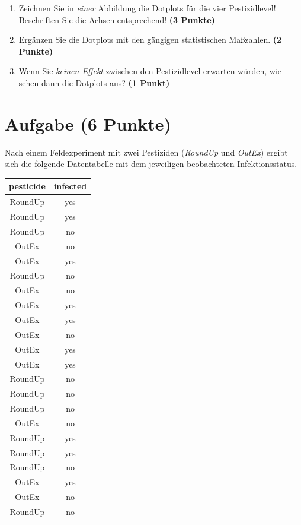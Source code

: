 \documentclass[a4paper, 10pt]{scrartcl}\usepackage[]{graphicx}\usepackage[]{xcolor}
\begin{document}
\begin{enumerate}
\item Zeichnen Sie in \textit{einer} Abbildung die Dotplots f{\"u}r die
  vier Pestizidlevel! Beschriften Sie die Achsen entsprechend!
  \textbf{(3 Punkte)}
\item Erg{\"a}nzen Sie die Dotplots mit den g{\"a}ngigen
  statistischen Ma{\ss}zahlen. \textbf{(2 Punkte)}
\item Wenn Sie \textit{keinen Effekt} zwischen den Pestizidlevel erwarten
  w{\"u}rden, wie sehen dann die Dotplots aus? \textbf{(1 Punkt)}
\end{enumerate} 
\clearpage

\section{Aufgabe \hfill (6 Punkte)}

Nach einem Feldexperiment mit zwei Pestiziden (\textit{RoundUp} und
\textit{OutEx}) ergibt sich die folgende Datentabelle mit dem jeweiligen
beobachteten Infektionsstatus.

\begin{table}[!h]
\centering
\begin{tabular}{cc}
\toprule
pesticide & infected\\
\midrule
RoundUp & yes\\
RoundUp & yes\\
RoundUp & no\\
OutEx & no\\
OutEx & yes\\
\addlinespace
RoundUp & no\\
OutEx & no\\
OutEx & yes\\
OutEx & yes\\
OutEx & no\\
\addlinespace
OutEx & yes\\
OutEx & yes\\
RoundUp & no\\
RoundUp & no\\
RoundUp & no\\
\addlinespace
OutEx & no\\
RoundUp & yes\\
RoundUp & yes\\
RoundUp & no\\
OutEx & yes\\
\addlinespace
OutEx & no\\
RoundUp & no\\
\bottomrule
\end{tabular}
\end{table}
\end{document}
